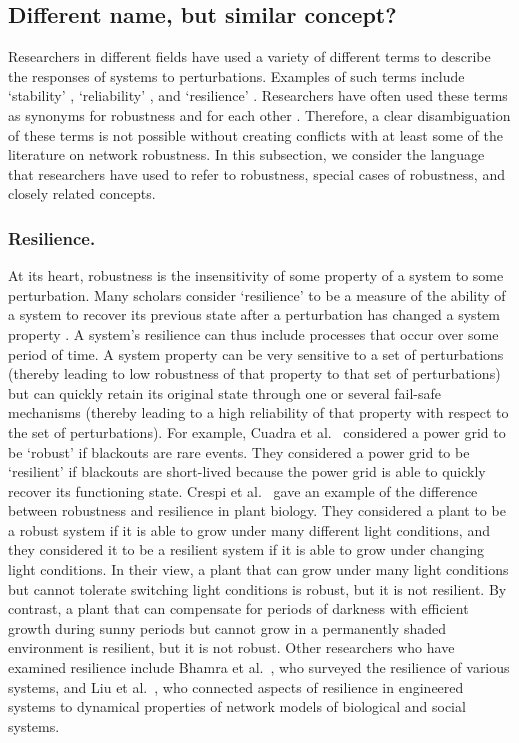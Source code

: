 \documentclass{comnet-mod}
\begin{document}
\subsection{Different name, but similar concept?}\label{sec:synonyms}

Researchers in different fields have used a variety of different terms to describe the responses of systems to perturbations. Examples of such terms include `stability' \cite{Dorato1987, Stelling2004, Lesne2008}, `reliability' \cite{Little2003, Rausand2004, Cuadra2015}, and `resilience' \cite{Bhamra2011}. Researchers have often used these terms as synonyms for robustness and for each other \cite{Dorato1987, Bhamra2011, Walsh2013, Cuadra2015}. Therefore, a clear disambiguation of these terms is not possible without creating conflicts with at least some of the literature on network robustness. In this subsection, we consider the language that researchers have used to refer to robustness, special cases of robustness, and closely related concepts. 


\subsubsection{Resilience.}\label{sec:resilience}

At its heart, robustness is the insensitivity of some property of a system to some perturbation. Many scholars consider `resilience' to be a measure of the ability of a system to recover its previous state after a perturbation has changed a system property \cite{Cuadra2015, Hosseini2016, Krakovska2024}. A system's resilience can thus include processes that occur over some period of time. A system property can be very sensitive to a set of perturbations (thereby leading to low robustness of that property to that set of perturbations) but can quickly retain its original state through one or several fail-safe mechanisms (thereby leading to a high reliability of that property with respect to the set of perturbations). For example, Cuadra et al.~\cite{Cuadra2015} considered a power grid to be `robust' if blackouts are rare events. They considered a power grid to be `resilient' if blackouts are short-lived because the power grid is able to quickly recover its functioning state. Crespi et al.~\cite{Crespi2021} gave an example of the difference between robustness and resilience in plant biology. They considered a plant to be a robust system if it is able to grow under many different light conditions, and they considered it to be a resilient system if it is able to grow under changing light conditions. In their view, a plant that can grow under many light conditions but cannot tolerate switching light conditions is robust, but it is not resilient. By contrast, a plant that can compensate for periods of darkness with efficient growth during sunny periods but cannot grow in a permanently shaded environment is resilient, but it is not robust. Other researchers who have examined resilience include Bhamra et al.~\cite{Bhamra2011}, who surveyed the resilience of various systems, and Liu et al.~\cite{Liu2022}, who connected aspects of resilience in engineered systems to dynamical properties of network models of biological and social systems.
\end{document}
